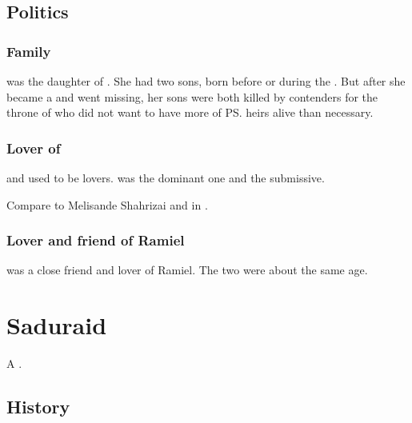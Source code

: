 \subsection{Politics}





\subsubsection{Family}
\Shiaraid{} was the daughter of . 
She had two sons, born before or during the \secondbanewar. 
But after she became a \malach{} and went missing, her sons were both killed by contenders for the throne of \Mystraacht{} who did not want to have more of \ps{\Zachirah} heirs alive than necessary. 





\subsubsection{Lover of \Aryal}
\Shiaraid{} and \Aryal{} used to be lovers. 
\Shiaraid{} was the dominant one and \Aryal{} the submissive. 

Compare to Melisande Shahrizai and \Phedre{} in . 





\subsubsection{Lover and friend of Ramiel}
\Shiaraid{} was a close friend and lover of Ramiel. 
The two were about the same age. 















\section{Saduraid}
A \resvil.









\subsection{History}





